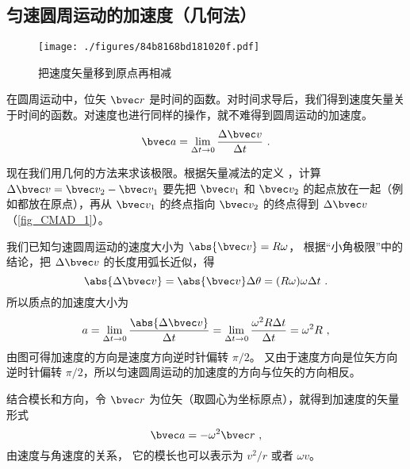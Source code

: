 

\subsection{匀速圆周运动的加速度（几何法）}

\begin{figure}[ht]
\centering
\texttt{[image: ./figures/84b8168bd181020f.pdf]}
\caption{把速度矢量移到原点再相减}\label{fig_CMAD_1}
\end{figure}

在圆周运动中，位矢 $\bvec r$ 是时间的函数。对时间求导后，我们得到速度矢量关于时间的函数。对速度也进行同样的操作，就不难得到圆周运动的加速度。
\begin{equation}
\bvec a = \lim_{\Delta t \to 0} \frac{\Delta \bvec v}{\Delta t}~.
\end{equation}

现在我们用几何的方法来求该极限。根据矢量减法的定义%
，计算 $\Delta \bvec v = \bvec v_2 - \bvec v_1$ 要先把 $\bvec v_1$ 和 $\bvec v_2$ 的起点放在一起（例如都放在原点），再从 $\bvec v_1$ 的终点指向 $\bvec v_2$ 的终点得到 $\Delta \bvec v$ （\autoref{fig_CMAD_1}）。 

我们已知匀速圆周运动的速度大小为 $\abs{\bvec v} = R\omega$， 根据“小角极限”中的结论，把 $\Delta\bvec v$ 的长度用弧长近似，得
\begin{equation}
\abs{\Delta \bvec v} = \abs{\bvec v}\Delta \theta  = (R\omega)\omega \Delta t~.
\end{equation}
所以质点的加速度大小为
\begin{equation}
a =\lim_{\Delta t \to 0} \frac{\abs{\Delta \bvec v}}{\Delta t} =  \lim_{\Delta t \to 0} \frac{\omega ^2 R \Delta t}{\Delta t} = \omega ^2 R~,
\end{equation}
由图可得加速度的方向是速度方向逆时针偏转 $\pi/2$。 又由于速度方向是位矢方向逆时针偏转 $\pi/2$，所以匀速圆周运动的加速度的方向与位矢的方向相反。

结合模长和方向，令 $\bvec r$ 为位矢（取圆心为坐标原点），就得到加速度的矢量形式
\begin{equation}\label{eq_CMAD_4}
\bvec a =  - \omega ^2 \bvec r~,
\end{equation}
由速度与角速度的关系， %
它的模长也可以表示为 $v^2/r$ 或者 $\omega v$。

